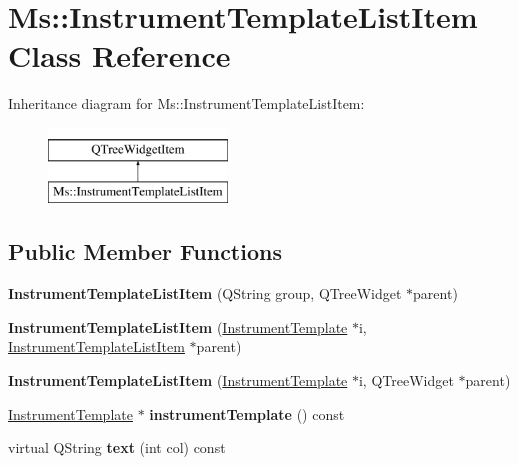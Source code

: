 \hypertarget{class_ms_1_1_instrument_template_list_item}{}\section{Ms\+:\+:Instrument\+Template\+List\+Item Class Reference}
\label{class_ms_1_1_instrument_template_list_item}
Inheritance diagram for Ms\+:\+:Instrument\+Template\+List\+Item\+:\begin{figure}[H]
\begin{center}
\leavevmode
\includegraphics[height=2.000000cm]{class_ms_1_1_instrument_template_list_item}
\end{center}
\end{figure}
\subsection*{Public Member Functions}
\begin{DoxyCompactItemize}
\item 
\mbox{\label{class_ms_1_1_instrument_template_list_item_a3143ad21036e3915b63eed8e82e1eba0}} 
{\bfseries Instrument\+Template\+List\+Item} (Q\+String group, Q\+Tree\+Widget $\ast$parent)
\item 
\mbox{\label{class_ms_1_1_instrument_template_list_item_aec3c4897397f716d1424b1db727fa61d}} 
{\bfseries Instrument\+Template\+List\+Item} (\hyperlink{class_ms_1_1_instrument_template}{Instrument\+Template} $\ast$i, \hyperlink{class_ms_1_1_instrument_template_list_item}{Instrument\+Template\+List\+Item} $\ast$parent)
\item 
\mbox{\label{class_ms_1_1_instrument_template_list_item_abccfc4fe51bf8b13283c37493932786b}} 
{\bfseries Instrument\+Template\+List\+Item} (\hyperlink{class_ms_1_1_instrument_template}{Instrument\+Template} $\ast$i, Q\+Tree\+Widget $\ast$parent)
\item 
\mbox{\label{class_ms_1_1_instrument_template_list_item_aef239d4fd9f9b65c7f169955170e6349}} 
\hyperlink{class_ms_1_1_instrument_template}{Instrument\+Template} $\ast$ {\bfseries instrument\+Template} () const
\item 
\mbox{\label{class_ms_1_1_instrument_template_list_item_a6a2efa67809486b4805e145449233f4a}} 
virtual Q\+String {\bfseries text} (int col) const
\end{DoxyCompactItemize}


